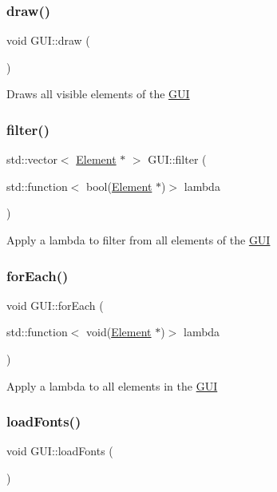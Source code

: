 \subsubsection{\texorpdfstring{draw()}{draw()}}
{\footnotesize\ttfamily void G\+U\+I\+::draw (\begin{DoxyParamCaption}{ }\end{DoxyParamCaption})}

Draws all visible elements of the \hyperlink{class_g_u_i}{G\+UI} \mbox{\label{class_g_u_i_a5c2ac00b75ff32fe22396e61c6ef9edd}} 
\subsubsection{\texorpdfstring{filter()}{filter()}}
{\footnotesize\ttfamily std\+::vector$<$ \hyperlink{class_element}{Element} $\ast$ $>$ G\+U\+I\+::filter (\begin{DoxyParamCaption}\item[{std\+::function$<$ bool(\hyperlink{class_element}{Element} $\ast$)$>$}]{lambda }\end{DoxyParamCaption})}

Apply a lambda to filter from all elements of the \hyperlink{class_g_u_i}{G\+UI} \mbox{\label{class_g_u_i_a5789f941b0b94492dcae57911f5a820d}} 
\subsubsection{\texorpdfstring{for\+Each()}{forEach()}}
{\footnotesize\ttfamily void G\+U\+I\+::for\+Each (\begin{DoxyParamCaption}\item[{std\+::function$<$ void(\hyperlink{class_element}{Element} $\ast$)$>$}]{lambda }\end{DoxyParamCaption})}

Apply a lambda to all elements in the \hyperlink{class_g_u_i}{G\+UI} \mbox{\label{class_g_u_i_acb6e7edb5e1b2046f64fabb9dc7f59d1}} 
\subsubsection{\texorpdfstring{load\+Fonts()}{loadFonts()}}
{\footnotesize\ttfamily void G\+U\+I\+::load\+Fonts (\begin{DoxyParamCaption}{ }\end{DoxyParamCaption})}

